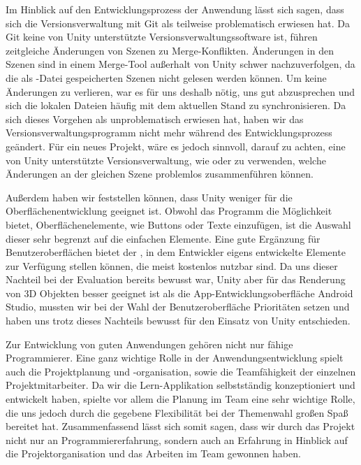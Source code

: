 Im Hinblick auf den Entwicklungsprozess der Anwendung lässt sich sagen, dass sich die Versionsverwaltung mit Git als teilweise problematisch erwiesen hat.
Da Git keine von Unity unterstützte Versionsverwaltungssoftware ist, führen zeitgleiche Änderungen von Szenen zu Merge-Konflikten.
Änderungen in den Szenen sind in einem Merge-Tool außerhalt von Unity schwer nachzuverfolgen, da die als -Datei gespeicherten Szenen nicht gelesen werden können. 
Um keine Änderungen zu verlieren, war es für uns deshalb nötig, uns gut abzusprechen und sich die lokalen Dateien häufig mit dem aktuellen Stand zu synchronisieren.
Da sich dieses Vorgehen als unproblematisch erwiesen hat, haben wir das Versionsverwaltungsprogramm nicht mehr während des Entwicklungsprozess geändert.
Für ein neues Projekt, wäre es jedoch sinnvoll, darauf zu achten, eine von Unity unterstützte Versionsverwaltung, wie  oder  zu verwenden, welche Änderungen an der gleichen Szene problemlos zusammenführen können.

Außerdem haben wir feststellen können, dass Unity weniger für die Oberflächenentwicklung geeignet ist. 
Obwohl das Programm die Möglichkeit bietet, Oberflächenelemente, wie Buttons oder Texte einzufügen, ist die Auswahl dieser sehr begrenzt auf die einfachen Elemente.
Eine gute Ergänzung für Benutzeroberflächen bietet der , in dem Entwickler eigens entwickelte Elemente zur Verfügung stellen können, die meist kostenlos nutzbar sind.
Da uns dieser Nachteil bei der Evaluation bereits bewusst war, Unity aber für das Renderung von 3D Objekten besser geeignet ist als die App-Entwicklungsoberfläche Android Studio, mussten wir bei der Wahl der Benutzeroberfläche Prioritäten setzen und haben uns trotz dieses Nachteils bewusst für den Einsatz von Unity entschieden.

Zur Entwicklung von guten Anwendungen gehören nicht nur fähige Programmierer.
Eine ganz wichtige Rolle in der Anwendungsentwicklung spielt auch die Projektplanung und -organisation, sowie die Teamfähigkeit der einzelnen Projektmitarbeiter.
Da wir die Lern-Applikation selbstständig konzeptioniert und entwickelt haben, spielte vor allem die Planung im Team eine sehr wichtige Rolle, die uns jedoch durch die gegebene Flexibilität bei der Themenwahl großen Spaß bereitet hat.
Zusammenfassend lässt sich somit sagen, dass wir durch das Projekt nicht nur an Programmiererfahrung, sondern auch an Erfahrung in Hinblick auf die Projektorganisation und das Arbeiten im Team gewonnen haben. 